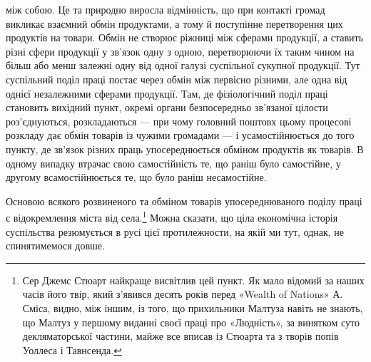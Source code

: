\parcont{}  %
між собою. Це та природно виросла відмінність, що при контакті
громад викликає взаємний обмін продуктами, а тому й поступінне
перетворення цих продуктів на товари. Обмін не створює ріжниці
між сферами продукції, а ставить різні сфери продукції у зв’язок
одну з одною, перетворюючи їх таким чином на більш або менш
залежні одну від одної галузі суспільної сукупної продукції.
Тут суспільний поділ праці постає через обмін між первісно різними,
але одна від однієї незалежними сферами продукції. Там,
де фізіологічний поділ праці становить вихідний пункт, окремі
органи безпосередньо зв’язаної цілости роз’єднуються, розкладаються
— при чому головний поштовх цьому процесові розкладу
дає обмін товарів із чужими громадами — і усамостійнюється
до того пункту, де зв’язок різних праць упосереднюється обміном
продуктів як товарів. В одному випадку втрачає свою самостійність
те, що раніш було самостійне, у другому всамостійнюється
те, що було раніш несамостійне.

Основою всякого розвиненого та обміном товарів упосереднюваного
поділу праці є відокремлення міста від села.\footnote{
Сер Джемс Стюарт найкраще висвітлив цей пункт. Як мало відомий
за наших часів його твір, який з’явився десять років перед «Wealth
of Nations» А. Сміса, видно, між іншим, із того, що прихильники
Малтуза навіть не знають, що Малтуз у першому виданні своєї праці
про «Людність», за винятком суто декляматорської частини, майже все
вписав із Стюарта та з творів попів Уоллеса і Тавнсенда.
} Можна
сказати, що ціла економічна історія суспільства резюмується
в русі цієї протилежности, на якій ми тут, однак, не спинятимемося
довше.

